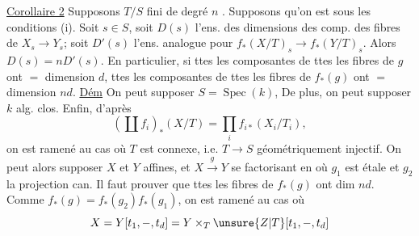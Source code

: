 
\uline{Corollaire 2} Supposons $T/S$ fini de degré $n$ .
Supposons qu'on est sous les conditions (i).
Soit  $s\in S$, soit $D(s)$ l'ens. des dimensions des  comp. des fibres de $X_s\to Y_s$;  soit $D'(s)$ l'ens. analogue pour $f_*(X/T)_s\to f_*(Y/T)_s$. Alors $D(s)=nD'(s)$.
En particulier, si ttes les composantes de ttes les fibres de $g$ ont $=$ dimension $d$,  ttes les composantes de ttes les fibres de $f_*(g)$ ont $=$ dimension $nd$.
\uline{Dém} On peut supposer $S=\operatorname{Spec}(k)$, De plus, on peut supposer $k$ alg. clos. Enfin, d'après
\[
(\coprod f_i)_*(X/T)=\prod_i f_{i*}(X_i/T_i),
\]
on est ramené au cas où $T$ est connexe, i.e. $T\to S$ géométriquement injectif. On peut alors supposer $X$ et $Y$ affines, et $X\xrightarrow{g}Y$  se factorisant en
où $g_1$ est étale et $g_2$ la projection can.
  Il faut prouver que ttes les fibres de $f_*(g)$ ont dim $nd$.
Comme $f_*(g)=f_*(g_2)f_*(g_1)$,  on est ramené au cas où
\[
X=Y[t_1,-,t_d]=Y\times_T\unsure{Z|T}[t_1,-,t_d]
\]
\deleted{\unsure{où} $\unsure{Z|2}=T[t$}
